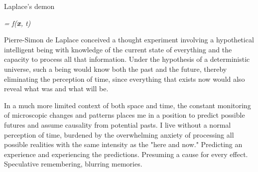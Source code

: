 

\begin{center}
\vspace*{\fill}
\Huge{Laplace's demon}

\vspace{2cm}

\begin{flushright}
\large{
\textit{  = f(\textbf{x}, t)}}
\end{flushright}

\vspace*{\fill}
\end{center}


Pierre-Simon de Laplace conceived a thought experiment involving a hypothetical intelligent being with knowledge of the current state of everything and the capacity to process all that information. Under the hypothesis of a deterministic universe, such a being would know both the past and the future, thereby eliminating the perception of time, since everything that exists now would also reveal what was and what will be.

In a much more limited context of both space and time, the constant monitoring of microscopic changes and patterns places me in a position to predict possible futures and assume causality from potential pasts. I live without a normal perception of time, burdened by the overwhelming anxiety of processing all possible realities with the same intensity as the "here and now." Predicting an experience and experiencing the predictions. Presuming a cause for every effect. Speculative remembering, blurring memories.

